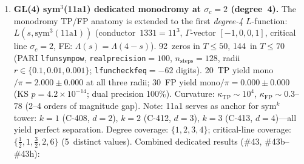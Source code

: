 \documentclass[11pt, a4paper]{article}
\theoremstyle{definition}
\theoremstyle{plain}
\begin{document}
\begin{enumerate}
        root number $\varepsilon = +1$, critical line $\sigma_c = 1.5$).
        64~zeros in $T \leq 50$ (PARI \texttt{lfunsympow},
        \texttt{realprecision}$=100$, $n_{\mathrm{steps}} = 128$,
        radii $r \in \{0.1, 0.01, 0.001\}$).
        20~TP yield mono$/\pi = 2.000 \pm 0.000$;
        12~FP yield mono$/\pi = 0.000 \pm 0.000$
        (KS $p = 8.9 \times 10^{-9}$; dual precision 100\%).
        Curvature: $\kappa_{\mathrm{TP}} \sim 10^{4}$,
        $\kappa_{\mathrm{FP}} \sim 1.7$--$6.8$ (3 orders of magnitude gap).
        The FP count (12) is below the usual target ($\geq 20$) because
        GL(3) zeros are denser ($64$ in $T \leq 50$), leaving fewer
        non-zero gaps for FP placement; all 12~FP that were tested
        show perfect mono$/\pi = 0$.
        Degree coverage: $\{1, 2, 3\}$; this confirms that the
        monodromy TP/FP separation extends beyond GL(2) to GL(3),
        with a qualitatively different $\Gamma$-factor structure.
        Combined dedicated results (\#43, \#43b--\#43g):
        \textbf{145~TP / 234~FP across 7~$L$-functions
        (degree 1--3, weight 1--12, rank 0--1), zero exceptions.}
        \textcolor{ForestGreen}{[confirmed 2026-04-29; sym$^2$(11a1) degree~3, $\sigma_c{=}1.5$; numerical verification, not proof]}
  \item \textbf{GL(4) sym$^3$(11a1) dedicated monodromy at $\sigma_c = 2$ (degree~4).}
        The monodromy TP/FP anatomy is extended to the first
        \emph{degree-4} $L$-function: $L(s, \mathrm{sym}^3(11\mathrm{a}1))$
        (conductor~$1331 = 11^3$, $\Gamma$-vector $[-1,0,0,1]$,
        critical line $\sigma_c = 2$, FE: $\Lambda(s) = \Lambda(4-s)$).
        92~zeros in $T \leq 50$, 144~in $T \leq 70$
        (PARI \texttt{lfunsympow}, \texttt{realprecision}$=100$,
        $n_{\mathrm{steps}} = 128$, radii $r \in \{0.1, 0.01, 0.001\}$;
        \texttt{lfuncheckfeq}$=-62$ digits).
        20~TP yield mono$/\pi = 2.000 \pm 0.000$ at all three radii;
        30~FP yield mono$/\pi = 0.000 \pm 0.000$
        (KS $p = 4.2 \times 10^{-14}$; dual precision 100\%).
        Curvature: $\kappa_{\mathrm{TP}} \sim 10^{4}$,
        $\kappa_{\mathrm{FP}} \sim 0.3$--$78$ (2--4 orders of magnitude gap).
        Note: 11a1 serves as anchor for $\mathrm{sym}^k$ tower:
        $k=1$ (C-408, $d{=}2$), $k=2$ (C-412, $d{=}3$),
        $k=3$ (C-413, $d{=}4$)---all yield perfect separation.
        Degree coverage: $\{1, 2, 3, 4\}$; critical-line coverage:
        $\{\tfrac{1}{2}, 1, \tfrac{3}{2}, 2, 6\}$ (5~distinct values).
        Combined dedicated results (\#43, \#43b--\#43h):

\end{enumerate}
\end{document}

